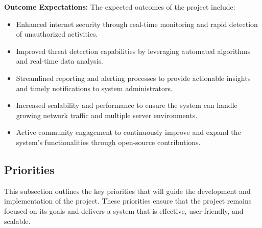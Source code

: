 \documentclass{article}
\begin{document}
    \textbf{Outcome Expectations:}
    The expected outcomes of the project include:
    \begin{itemize}
        \item Enhanced internet security through real-time monitoring and rapid detection of unauthorized activities.
        \item Improved threat detection capabilities by leveraging automated algorithms and real-time data analysis.
        \item Streamlined reporting and alerting processes to provide actionable insights and timely notifications to system administrators.
        \item Increased scalability and performance to ensure the system can handle growing network traffic and multiple server environments.
        \item Active community engagement to continuously improve and expand the system's functionalities through open-source contributions.
    \end{itemize}

    \subsection{Priorities}\label{subsec:priorities}

    This subsection outlines the key priorities that will guide the development and implementation of the project.
    These priorities ensure that the project remains focused on its goals and delivers a system that is effective, user-friendly, and scalable.
\end{document}
